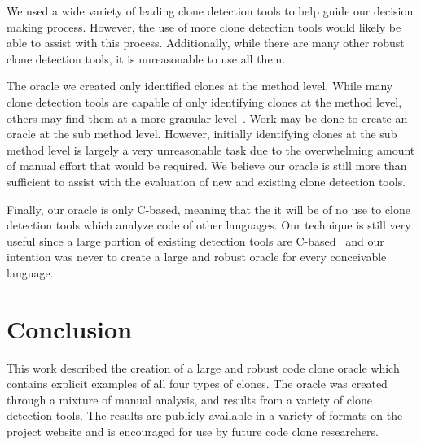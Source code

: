 \documentclass{sig-alternate}
\begin{document}
We used a wide variety of leading clone detection tools to help guide our decision making process. However, the use of more clone detection tools would likely be able to assist with this process. Additionally, while there are many other robust clone detection tools, it is unreasonable to use all them.

The oracle we created only identified clones at the method level. While many clone detection tools are capable of only identifying clones at the method level, others may find them at a more granular level~\cite{Roy:2009:CEC:1530898.1531101}. Work may be done to create an oracle at the sub method level. However, initially identifying clones at the sub method level is largely a very unreasonable task due to the overwhelming amount of manual effort that would be required. We believe our oracle is still more than sufficient to assist with the evaluation of new and existing clone detection tools.

Finally, our oracle is only C-based, meaning that the it will be of no use to clone detection tools which analyze code of other languages. Our technique is still very useful since a large portion of existing detection tools are C-based~\cite{Roy:2009:CEC:1530898.1531101} and our intention was never to create a large and robust oracle for every conceivable language.


\section{Conclusion}
\label{sec: conclusion}

This work described the creation of a large and robust code clone oracle which contains explicit examples of all four types of clones. The oracle was created through a mixture of manual analysis, and results from a variety of clone detection tools. The results are publicly available in a variety of formats on the project website and is encouraged for use by future code clone researchers.






\end{document}

